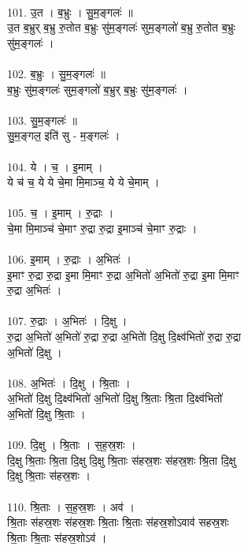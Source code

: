 \\
101. उ॒त । ब॒भ्रुः । सु॒म॒ङ्गलः॑ ॥\\
उ॒त ब॒भ्रुर् ब॒भ्रु रु॒तोत ब॒भ्रुः सु॑म॒ङ्गलः॑ सुम॒ङ्गलो॑ ब॒भ्रु रु॒तोत ब॒भ्रुः\\
सु॑म॒ङ्गलः॑ ।\\
\\
102. ब॒भ्रुः । सु॒म॒ङ्गलः॑ ॥\\
ब॒भ्रुः सु॑म॒ङ्गलः॑ सुम॒ङ्गलो॑ ब॒भ्रुर् ब॒भ्रुः सु॑म॒ङ्गलः॑ ।\\
\\
103. सु॒म॒ङ्गलः॑ ॥\\
सु॒म॒ङ्गल॒ इति॑ सु - म॒ङ्गलः॑ ।\\
\\
104. ये । च॒ । इ॒माम् ।\\
ये च॑ च॒ ये ये चे॒मा मि॒माञ्च॒ ये ये चे॒माम् ।\\
\\
105. च॒ । इ॒माम् । रु॒द्राः ।\\
चे॒मा मि॒माञ्च॑ चे॒माꣳ रु॒द्रा रु॒द्रा इ॒माञ्च॑ चे॒माꣳ रु॒द्राः ।\\
\\
106. इ॒माम् । रु॒द्राः । अ॒भितः॑ ।\\
इ॒माꣳ रु॒द्रा रु॒द्रा इ॒मा मि॒माꣳ रु॒द्रा अ॒भितो॑ अ॒भितो॑ रु॒द्रा इ॒मा मि॒माꣳ\\
रु॒द्रा अ॒भितः॑ ।\\
\\
107. रु॒द्राः । अ॒भितः॑ । दि॒क्षु ।\\
रु॒द्रा अ॒भितो॑ अ॒भितो॑ रु॒द्रा रु॒द्रा अ॒भिताे॑ दि॒क्षु दि॒क्ष्व॑भितो॑ रु॒द्रा रु॒द्रा\\
अ॒भितो॑ दि॒क्षु ।\\
\\
108. अ॒भितः॑ । दि॒क्षु । श्रि॒ताः ।\\
अ॒भितो॑ दि॒क्षु दि॒क्ष्व॑भितो॑ अ॒भितो॑ दि॒क्षु श्रि॒ताः श्रि॒ता दि॒क्ष्व॑भितो॑\\
अ॒भितो॑ दि॒क्षु श्रि॒ताः ।\\
\\
109. दि॒क्षु । श्रि॒ताः । स॒ह॒स्र॒शः ।\\
दि॒क्षु श्रि॒ताः श्रि॒ता दि॒क्षु दि॒क्षु श्रि॒ताः स॑हस्र॒शः स॑हस्र॒शः श्रि॒ता दि॒क्षु\\
दि॒क्षु श्रि॒ताः स॑हस्र॒शः ।\\
\\
110. श्रि॒ताः । स॒ह॒स्र॒शः । अव॑ ।\\
श्रि॒ताः स॑हस्र॒शः स॑हस्र॒शः श्रि॒ताः श्रि॒ताः स॑हस्र॒शोऽवाव॑ सहस्र॒शः\\
श्रि॒ताः श्रि॒ताः स॑हस्र॒शोऽव॑ ।\\

